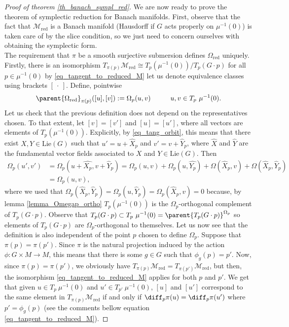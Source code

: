 \begin{proof}[\textit{Proof of theorem} \ref{th_banach_sympl_red}]
    We are now ready to prove the theorem of symplectic reduction for Banach manifolds. First, observe that the fact that \(\mathcal{M}_{\mathrm{red}}\) is a Banach manifold (Hausdorff if \(G\) acts properly on \(\mu^{-1}(0)\)) is taken care of by the slice condition, so we just need to concern ourselves with obtaining the symplectic form.\\

    The requirement that \(\pi\) be a smooth surjective submersion defines \(\Omega_{\mathrm{red}}\) uniquely. Firstly, there is an isomorphism \(T_{\pi(p)}\mathcal{M}_{\mathrm{red}} \cong T_p (\mu^{-1}(0))/T_p(G \cdot p)\) for all \(p \in \mu^{-1}(0)\) by \eqref{eq_tangent_to_reduced_M} let us denote equivalence classes using brackets \([\ \cdot \ ]\). Define, pointwise
    \[
    \parent{\Omega_{\mathrm{red}}}_{\pi(p)}([u], [v]):=\Omega_p(u,v) \hspace{1 cm} u,v \in T_p\ \mu^{-1}(0).
    \]
    Let us check that the previous definition does not depend on the representatives chosen. To that extent, let \([v]=[v']\) and \([u]=[u']\), where all vectors are elements of \(T_p(\mu^{-1}(0))\). Explicitly, by \eqref{eq_tang_orbit}, this means that there exist \(X, Y \in \mathrm{Lie}(G)\) such that \(u'=u+\hat{X}_p\) and \(v'=v+\hat{Y}_p\), where \(\hat{X}\) and \(\hat{Y}\) are the fundamental vector fields associated to \(X\) and \(Y\in \mathrm{Lie}(G)\). Then
    \begin{align*}
        \Omega_p(u', v') & = \Omega_p(u+\hat{X_p}, v+\hat{Y}_p) = \Omega_p(u,v) + \Omega_p(u, \hat{Y_p}) + \Omega(\hat{X}_p, v) + \Omega(\hat{X}_p, \hat{Y}_p) \\
        & = \Omega_p(u,v),
    \end{align*}
    where we used that \(\Omega_p(\hat{X}_p, \hat{Y}_p) = \Omega_p(u, \hat{Y}_p)=\Omega_p(\hat{X}_p, v)=0\) because, by lemma \ref{lemma_Omegap_ortho} \(T_p(\mu^{-1}(0))\) is the \(\Omega_p\)-orthogonal complement of \(T_p(G \cdot p)\). Observe that \(T_p(G \cdot p) \subset T_p \ \mu^{-1}(0)=\parent{T_p (G \cdot p)}^{\Omega_p}\) so elements of \(T_p(G \cdot p)\) are \(\Omega_p\)-orthogonal to themselves. Let us now see that the definition is also independent of the point \(p\) chosen to define \(\Omega_p\). Suppose that \(\pi(p)=\pi(p')\). Since \(\pi\) is the natural projection induced by the action \(\phi\colon G \times M \to M\), this means that there is some \(g \in G\) such that \(\phi_g(p)=p'\). Now, since \(\pi(p)=\pi(p')\), we obviously have \(T_{\pi(p)}\mathcal{M}_{\mathrm{red}}=T_{\pi(p')}\mathcal{M}_{\mathrm{red}}\), but then, the isomorphism \eqref{eq_tangent_to_reduced_M} applies for both \(p\) and \(p'\). We get that given \(u \in T_p \ \mu^{-1}(0)\) and \(u'\in T_{p'} \ \mu^{-1}(0)\), \([u]\) and \([u']\) correspond to the same element in \(T_{\pi(p)}\mathcal{M}_{\mathrm{red}}\) if and only if \(\diff_p\pi(u)=\diff_p \pi(u')\) where \(p'=\phi_g(p)\) (see the comments bellow equation \eqref{eq_tangent_to_reduced_M}). 

\end{proof}

